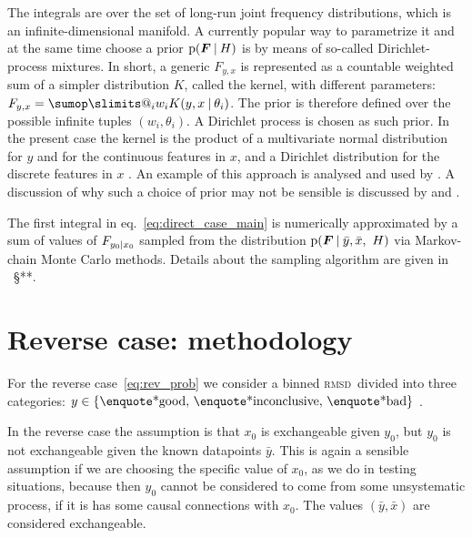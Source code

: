 \documentclass[\ifafour a4paper,12pt,\else a5paper,10pt,\fi%
onecolumn,oneside,article,%
british%
]{memoir}
\makeatletter
\theoremstyle{remark}
\theoremstyle{innote}
\def\sum{\DOTSI\sumop\slimits@}
\DeclarePairedDelimiter\set{\{}{\}}
\newcommand*{\p}{\mathrm{p}}%
\renewcommand*{\|}[1][]{\nonscript\:#1\vert\nonscript\:\mathopen{}}
\renewcommand*{\=}{\TextOrMath\texteq\eq}
\newcommand*{\sect}{\S}%
\newcommand*{\eqn}{eq.}%
\newcommand*{\wrench}{{\fontencoding{U}\fontfamily{fontawesomethree}\selectfont\symbol{114}}}
\newcommand{\mynote}[1]{ {\color{notecolour}#1}}
\newcommand*{\rmsd}{\textsc{rmsd}}
\newcommand*{\wy}{\bar{y}}
\newcommand*{\wx}{\bar{x}}
\newcommand*{\yF}{\bm{F}}
\makeatother
\begin{document}
The integrals are over the set of long-run joint frequency distributions,
which is an infinite-dimensional manifold. A currently popular way to
parametrize it and at the same time choose a prior $\p(\yF \| H)$ is by
means of so-called Dirichlet-process mixtures. In short, a generic
$F_{y,x}$ is represented as a countable weighted sum of a simpler
distribution $K$, called the kernel, with different parameters:
$F_{y,x} = \sum_{i}w_{i} K(y,x \| \theta_{i})$. The prior is therefore
defined over the possible infinite tuples $(w_{i},\theta_{i})$. A Dirichlet
process is chosen as such prior. In the present case the kernel is the
product of a multivariate normal distribution for $y$ and for the
continuous features in $x$, and a Dirichlet distribution for the discrete
features in $x$ \parencites[\sect~3.3]{liveranietal2015}. An example of
this approach is analysed and used by \textcites{muelleretal1996}. A
discussion of why such a choice of prior may not be sensible is discussed
by \textcite{petrone2017} and \textcite[\sect~4]{quintanaetal2020}.



The first integral in \eqn~\eqref{eq:direct_case_main} is numerically
approximated by a sum of values of $F_{y_{0} \| x_{0}}$ sampled from the
distribution $\p(\yF \| \wy, \wx,\ H)$ via Markov-chain Monte Carlo
methods. Details about the sampling algorithm are given in \mynote{\wrench\
  \sect***}.

\section{Reverse case: methodology}
\label{sec:reverse_method}

For the reverse case~\eqref{eq:rev_prob} we consider a binned \rmsd\
divided into three categories:
$y \in \set{\text{\enquote*{good}},\, \text{\enquote*{inconclusive}},\,
  \text{\enquote*{bad}}}$ .

In the reverse case the assumption is that $x_{0}$ is exchangeable given
$y_{0}$, but $y_{0}$ is not exchangeable given the known datapoints $\wy$.
This is again a sensible assumption if we are choosing the specific value
of $x_{0}$, as we do in testing situations, because then $y_{0}$ cannot be
considered to come from some unsystematic process, if it is has some causal
connections with $x_{0}$. The values $(\wy,\wx)$ are considered
exchangeable.
\end{document}
